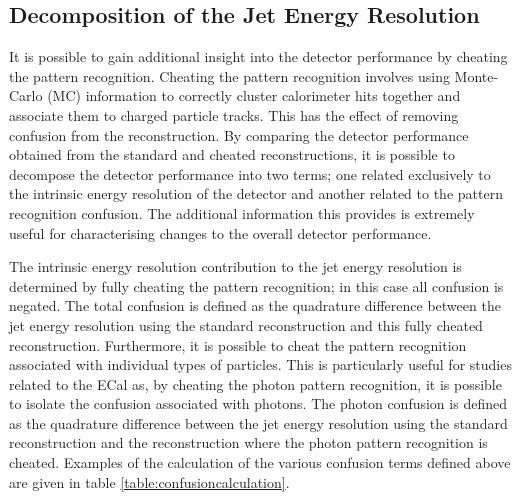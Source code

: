 \subsection{Decomposition of the Jet Energy Resolution}
\label{sec:jerdecomposition}
It is possible to gain additional insight into the detector performance by cheating the pattern recognition.  Cheating the pattern recognition involves using Monte-Carlo (MC) information to correctly cluster calorimeter hits together and associate them to charged particle tracks.  This has the effect of removing confusion from the reconstruction.  By comparing the detector performance obtained from the standard and cheated reconstructions, it is possible to decompose the detector performance into two terms; one related exclusively to the intrinsic energy resolution of the detector and another related to the pattern recognition confusion.  The additional information this provides is extremely useful for characterising changes to the overall detector performance.  

The intrinsic energy resolution contribution to the jet energy resolution is determined by fully cheating the pattern recognition; in this case all confusion is negated.  The total confusion is defined as the quadrature difference between the jet energy resolution using the standard reconstruction and this fully cheated reconstruction.  Furthermore, it is possible to cheat the pattern recognition associated with individual types of particles.  This is particularly useful for studies related to the ECal as, by cheating the photon pattern recognition, it is possible to isolate the confusion associated with photons.  The photon confusion is defined as the quadrature difference between the jet energy resolution using the standard reconstruction and the reconstruction where the photon pattern recognition is cheated.  Examples of the calculation of the various confusion terms defined above are given in table \ref{table:confusioncalculation}.

